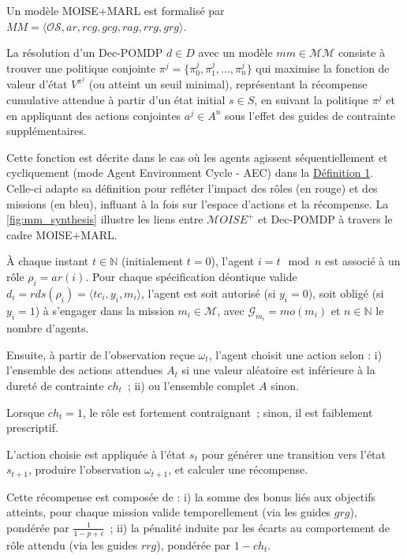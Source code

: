 Un modèle MOISE+MARL est formalisé par $MM = \langle \mathcal{OS}, ar, rcg, gcg, rag, rrg, grg\rangle$.

La résolution d'un Dec-POMDP $d \in D$ avec un modèle $mm \in \mathcal{MM}$ consiste à trouver une politique conjointe $\pi^{j} = \{\pi^j_0, \pi^j_1, \dots, \pi^j_n\}$ qui maximise la fonction de valeur d'état $V^{\pi^{j}}$ (ou atteint un seuil minimal), représentant la récompense cumulative attendue à partir d'un état initial $s \in S$, en suivant la politique $\pi^{j}$ et en appliquant des actions conjointes $a^{j} \in A^n$ sous l'effet des guides de contrainte supplémentaires.

Cette fonction est décrite dans le cas où les agents agissent séquentiellement et cycliquement (mode Agent Environment Cycle - AEC) dans la \hyperref[eq:single_value_function]{Définition 1}. Celle-ci adapte sa définition pour refléter l'impact des rôles (en rouge) et des missions (en bleu), influant à la fois sur l'espace d'actions et la récompense. La \autoref{fig:mm_synthesis} illustre les liens entre $\mathcal{M}OISE^+$ et Dec-POMDP à travers le cadre MOISE+MARL.

À chaque instant $t \in \mathbb{N}$ (initialement $t = 0$), l'agent $i = t \mod n$ est associé à un rôle $\rho_i = ar(i)$. Pour chaque spécification déontique valide $d_i = rds(\rho_i) = \langle tc_i, y_i, m_i \rangle$, l'agent est soit autorisé (si $y_i = 0$), soit obligé (si $y_i = 1$) à s'engager dans la mission $m_i \in \mathcal{M}$, avec $\mathcal{G}_{m_i} = mo(m_i)$ et $n \in \mathbb{N}$ le nombre d'agents.

Ensuite, à partir de l'observation reçue $\omega_t$, l'agent choisit une action selon :
i) l'ensemble des actions attendues $A_t$ si une valeur aléatoire est inférieure à la dureté de contrainte $ch_t$~;
ii) ou l'ensemble complet $A$ sinon.

Lorsque $ch_t = 1$, le rôle est fortement contraignant~; sinon, il est faiblement prescriptif.

L'action choisie est appliquée à l'état $s_t$ pour générer une transition vers l'état $s_{t+1}$, produire l'observation $\omega_{t+1}$, et calculer une récompense.

Cette récompense est composée de :
i) la somme des bonus liés aux objectifs atteints, pour chaque mission valide temporellement (via les guides $grg$), pondérée par $\frac{1}{1 - p + \epsilon}$~;
ii) la pénalité induite par les écarts au comportement de rôle attendu (via les guides $rrg$), pondérée par $1 - ch_t$.

